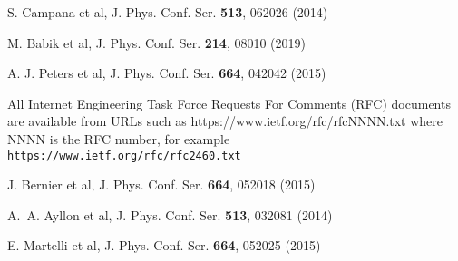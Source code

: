 \begin{thebibliography}{}
%
%


S. Campana et al, J. Phys. Conf. Ser. {\bf513}, 062026 (2014)



M. Babik et al, J. Phys. Conf. Ser. {\bf214}, 08010 (2019)

 A. J. Peters et al, J. Phys. Conf. Ser. {\bf664}, 042042 (2015)



All Internet Engineering Task Force Requests For Comments (RFC) documents are available
from URLs such as https://www.ietf.org/rfc/rfcNNNN.txt where NNNN is the RFC number, for example {\tt https://www.ietf.org/rfc/rfc2460.txt}




J. Bernier et al, J. Phys. Conf. Ser. {\bf664}, 052018 (2015)

A.~A. Ayllon et al, 
J. Phys. Conf. Ser. {\bf 513}, 032081 (2014)


E. Martelli et al, J. Phys. Conf. Ser. {\bf 664}, 052025 (2015)









\end{thebibliography}
